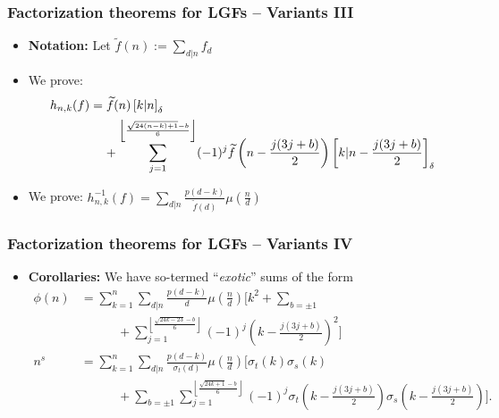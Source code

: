 \begin{frame}
\frametitle{Factorization theorems for LGFs -- Variants III}
\begin{itemize} 

\item \textbf{Notation:} Let $\widetilde{f}(n) := \sum_{d|n} f_d$
\pause\item We prove: 
      {\small
      \begin{align*}
      h_{n,k}(f) & = \widetilde{f}(n) \left[k|n\right]_{\delta} \\ 
           & \phantom{=\ } + 
	   \sum\limits_{j=1}^{\left\lfloor \frac{\sqrt{24(n-k)+1}-b}{6} \right\rfloor} 
           (-1)^j \widetilde{f}\left(n-\frac{j(3j+b)}{2}\right) \left[k|n-\frac{j(3j+b)}{2}\right]_{\delta}
      \end{align*}
      }
\pause\item We prove: $h_{n,k}^{-1}(f) = \sum\limits_{d|n} \frac{p(d-k)}{\widetilde{f}(d)} \mu\left(\frac{n}{d}\right)$

\end{itemize}

\end{frame}

\begin{frame}
\frametitle{Factorization theorems for LGFs -- Variants IV}
\begin{itemize} 

\item \textbf{Corollaries:} We have so-termed ``\emph{exotic}'' sums of the form 
      {\scriptsize
      \begin{align*}
      \phi(n) & = \sum_{k=1}^n \sum_{d|n} \frac{p(d-k)}{d} \mu\left(\frac{n}{d}\right) \Biggl[k^2 + 
           \sum_{b=\pm 1} \\ 
          & \phantom{=\sum\ } + 
	  \sum_{j=1}^{\left\lfloor \frac{\sqrt{24k-23}-b}{6} \right\rfloor} (-1)^j 
          \left(k-\frac{j(3j+b)}{2}\right)^2\Biggr] \\ 
      n^s & = \sum_{k=1}^n \sum_{d|n} \frac{p(d-k)}{\sigma_t(d)} \mu\left(\frac{n}{d}\right) 
          \Biggl[\sigma_t(k)\sigma_s(k) \\ 
          & \phantom{=\sum\ } + 
          \sum_{b=\pm 1} \sum_{j=1}^{\left\lfloor \frac{\sqrt{24k+1}-b}{6} \right\rfloor} (-1)^j 
          \sigma_t\left(k-\frac{j(3j+b)}{2}   \right)\sigma_s\left(k-\frac{j(3j+b)}{2}\right)\Biggr]. 
      \end{align*}
      }

\end{itemize}

\end{frame}


 
